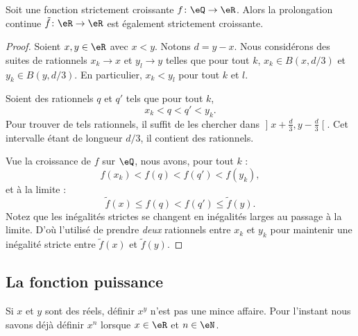 \begin{proposition}      \label{PROPooTNIAooNAJDzL}
    Soit une fonction strictement croissante \( f\colon \eQ\to \eR\). Alors la prolongation continue \( \tilde f\colon \eR\to \eR\) est également strictement croissante.
\end{proposition}

\begin{proof}
    Soient \( x,y\in \eR\) avec \( x<y\). Notons \( d=y-x\). Nous considérons des suites de rationnels \( x_k\to x\) et \( y_l\to y\) telles que pour tout \( k\), \( x_k\in B(x,d/3)\) et \( y_k\in B(y,d/3)\). En particulier, \( x_k<y_l\) pour tout \( k\) et \( l\).

    Soient des rationnels \( q\) et \( q'\) tels que pour tout \( k\),
    \begin{equation}
        x_k<q<q'<y_k.
    \end{equation}
    Pour trouver de tels rationnels, il suffit de les chercher dans \( \mathopen] x+\frac{ d }{ 3 } , y-\frac{ d }{ 3 } \mathclose[\). Cet intervalle étant de longueur \( d/3\), il contient des rationnels.

    Vue la croissance de \( f\) sur \( \eQ\), nous avons, pour tout \( k\) :
    \begin{equation}
        f(x_k)<f(q)<f(q')<f(y_k),
    \end{equation}
    et à la limite :
    \begin{equation}
        \tilde f(x)\leq f(q)<f(q')\leq \tilde f(y).
    \end{equation}
    Notez que les inégalités strictes se changent en inégalités larges au passage à la limite. D'où l'utilisé de prendre \emph{deux} rationnels entre \( x_k\) et \( y_k\) pour maintenir une inégalité stricte entre \(\tilde f(x)\) et \( \tilde f(y)\).

\end{proof}

\subsection{La fonction puissance}
\label{SUBSECooAYCLooNRvLEp}

Si \( x\) et \( y\) sont des réels, définir \( x^y\) n'est pas une mince affaire. Pour l'instant nous savons déjà définir \( x^n\) lorsque \( x\in \eR\) et \( n\in \eN\).


